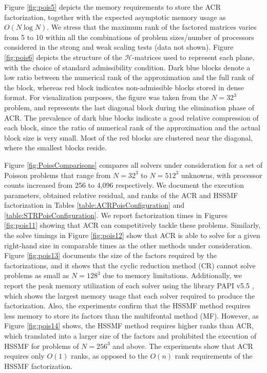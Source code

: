 \documentclass[]{elsarticle}
\begin{document}
Figure \ref{fig:pois5} depicts the memory requirements to store the ACR factorization, together with the expected asymptotic memory usage as $O(N \log N)$.
We stress that the maximum rank of the factored matrices varies from 5 to 10 within all the combinations of problem sizes/number of processors considered in the strong and weak scaling tests (data not shown). Figure \ref{fig:pois6} depicts the structure of the $\mathcal{H}$-matrices used to represent each plane, with the choice of standard admissibility condition. Dark blue blocks denote a low ratio between the numerical rank of the approximation and the full rank of the block, whereas red block indicates non-admissible blocks stored in dense format. For visualization purposes, the figure was taken from the $N=32^3$ problem, and represents the last diagonal block during the elimination phase of ACR. The prevalence of dark blue blocks indicate a good relative compression of each block, since the ratio of numerical rank of the approximation and the actual block size is very small. Most of the red blocks are clustered near the diagonal, where the smallest blocks reside.

Figure \ref{fig:PoissComparisons} compares all solvers under consideration for a set of Poisson problems that range from $N=32^3$ to $N=512^3$ unknowns, with processor counts increased from 256 to 4,096 respectively.
We document the execution parameters, obtained relative residual, and ranks of the ACR and HSSMF factorization in Tables \ref{table:ACRPoisConfiguration} and \ref{table:STRPoisConfiguration}. 
We report factorization times in Figures \ref{fig:pois11} showing that ACR can competitively tackle these problems. Similarly, the solve timings in Figure \ref{fig:pois12} show that ACR is able to solve for a given right-hand size in comparable times as the other methods under consideration. Figure \ref{fig:pois13} documents the size of the factors required by the factorizations, and it shows that the cyclic reduction method (CR) cannot solve problems as small as $N=128^3$ due to memory limitations.
Additionally, we report the peak memory utilization of each solver using the library PAPI v5.5 \cite{browne2000PAPI}, which shows the largest memory usage that each solver required to produce the factorization.
Also, the experiments confirm that the HSSMF method requires less memory to store its factors than the multifrontal method (MF). However, as Figure \ref{fig:pois14} shows, the HSSMF method requires higher ranks than ACR, which translated into a larger size of the factors and prohibited the execution of HSSMF for problems of $N=256^3$ and above. 
The experiments show that ACR requires only $O(1)$ ranks, as opposed to the $O(n)$ rank requirements of the HSSMF factorization.
\end{document}
